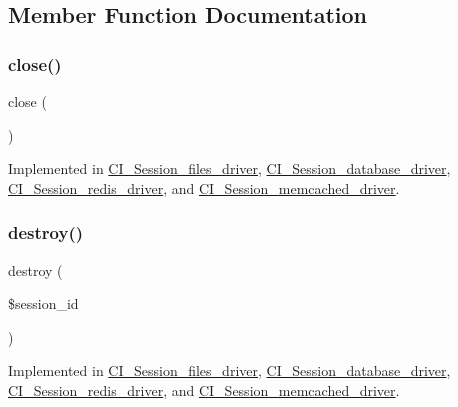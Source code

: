\subsection{Member Function Documentation}
\mbox{\label{interface_session_handler_interface_aa69c8bf1f1dcf4e72552efff1fe3e87e}} 
\subsubsection{\texorpdfstring{close()}{close()}}
{\footnotesize\ttfamily close (\begin{DoxyParamCaption}{ }\end{DoxyParamCaption})}



Implemented in \mbox{\hyperlink{class_c_i___session__files__driver_aa69c8bf1f1dcf4e72552efff1fe3e87e}{C\+I\+\_\+\+Session\+\_\+files\+\_\+driver}}, \mbox{\hyperlink{class_c_i___session__database__driver_aa69c8bf1f1dcf4e72552efff1fe3e87e}{C\+I\+\_\+\+Session\+\_\+database\+\_\+driver}}, \mbox{\hyperlink{class_c_i___session__redis__driver_aa69c8bf1f1dcf4e72552efff1fe3e87e}{C\+I\+\_\+\+Session\+\_\+redis\+\_\+driver}}, and \mbox{\hyperlink{class_c_i___session__memcached__driver_aa69c8bf1f1dcf4e72552efff1fe3e87e}{C\+I\+\_\+\+Session\+\_\+memcached\+\_\+driver}}.

\mbox{\label{interface_session_handler_interface_aaec5812f6b4eb6835f88d3baa06a002a}} 
\subsubsection{\texorpdfstring{destroy()}{destroy()}}
{\footnotesize\ttfamily destroy (\begin{DoxyParamCaption}\item[{}]{\$session\+\_\+id }\end{DoxyParamCaption})}



Implemented in \mbox{\hyperlink{class_c_i___session__files__driver_aaec5812f6b4eb6835f88d3baa06a002a}{C\+I\+\_\+\+Session\+\_\+files\+\_\+driver}}, \mbox{\hyperlink{class_c_i___session__database__driver_aaec5812f6b4eb6835f88d3baa06a002a}{C\+I\+\_\+\+Session\+\_\+database\+\_\+driver}}, \mbox{\hyperlink{class_c_i___session__redis__driver_aaec5812f6b4eb6835f88d3baa06a002a}{C\+I\+\_\+\+Session\+\_\+redis\+\_\+driver}}, and \mbox{\hyperlink{class_c_i___session__memcached__driver_aaec5812f6b4eb6835f88d3baa06a002a}{C\+I\+\_\+\+Session\+\_\+memcached\+\_\+driver}}.

